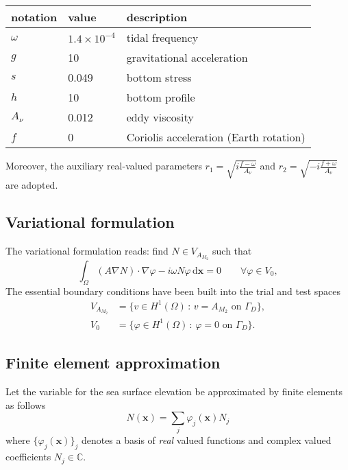 \documentclass[11pt,a4paper]{article}
\begin{document}
\begin{center}
\begin{tabular}{|l|l|l|}
\hline
notation & value & description\\
\hline
$\omega$ & $1.4\times 10^{-4}$ &tidal frequency\\
$g$ & 10 & gravitational acceleration\\
$s$ & 0.049 & bottom stress\\
$h$ & 10 & bottom profile\\
$A_\nu$ & 0.012 & eddy viscosity\\
$f$ & 0 & Coriolis acceleration (Earth rotation)\\
\hline
\end{tabular}
\end{center}
Moreover, the auxiliary real-valued parameters $r_1=\sqrt{i\frac{f-\omega}{A_\nu}}$ and $r_2=\sqrt{-i\frac{f+\omega}{A_\nu}}$ are adopted.

\subsection{Variational formulation}
The variational formulation reads: find $N\in V_{A_{M_2}}$ such that
\begin{equation}
\int_\Omega(A\nabla N)\cdot\nabla \varphi- i\omega N \varphi\,\mathrm{d}\mathbf{x}=0\qquad \forall \varphi\in V_0,
\end{equation}
The essential boundary conditions have been built into the trial and test spaces
\begin{align}
V_{A_{M_2}}&=\{v\in H^1(\Omega)\,:\, v=A_{M_2}\text{ on }\Gamma_D\},\\
V_0&=\{\varphi\in H^1(\Omega)\,:\, \varphi=0\text{ on }\Gamma_D\}.
\end{align}

\subsection{Finite element approximation}
Let the variable for the sea surface elevation be approximated by finite elements as follows
\begin{equation}
N(\mathbf{x})=\sum_{j}\varphi_j(\mathbf{x})N_j 
\end{equation}
where $\{\varphi_j(\mathbf{x})\}_j$ denotes a basis of \emph{real} valued functions and complex valued coefficients $N_j\in\mathbb{C}$.
\end{document}
